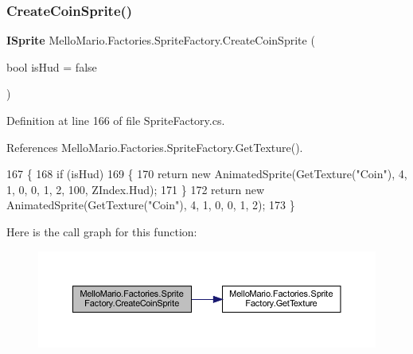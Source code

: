 \subsubsection{Create\+Coin\+Sprite()}
{\footnotesize\ttfamily \textbf{ I\+Sprite} Mello\+Mario.\+Factories.\+Sprite\+Factory.\+Create\+Coin\+Sprite (\begin{DoxyParamCaption}\item[{bool}]{is\+Hud = {\ttfamily false} }\end{DoxyParamCaption})}



Definition at line 166 of file Sprite\+Factory.\+cs.



References Mello\+Mario.\+Factories.\+Sprite\+Factory.\+Get\+Texture().


\begin{DoxyCode}
167         \{
168             \textcolor{keywordflow}{if} (isHud)
169             \{
170                 \textcolor{keywordflow}{return} \textcolor{keyword}{new} AnimatedSprite(GetTexture(\textcolor{stringliteral}{"Coin"}), 4, 1, 0, 0, 1, 2, 100, 
      ZIndex.Hud);
171             \}
172             \textcolor{keywordflow}{return} \textcolor{keyword}{new} AnimatedSprite(GetTexture(\textcolor{stringliteral}{"Coin"}), 4, 1, 0, 0, 1, 2);
173         \}
\end{DoxyCode}
Here is the call graph for this function\+:
\nopagebreak
\begin{figure}[H]
\begin{center}
\leavevmode
\includegraphics[width=350pt]{classMelloMario_1_1Factories_1_1SpriteFactory_af7d4d69077fbfe7c1181eb5289bf2ddf_cgraph}
\end{center}
\end{figure}
\mbox{\label{classMelloMario_1_1Factories_1_1SpriteFactory_abee128ffc6f83e1c4c9f3500f54113e9}} 
